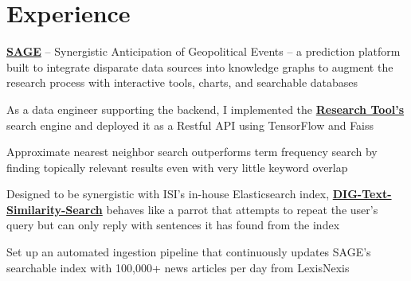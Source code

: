 \documentclass[letterpaper]{deedy-resume} %
\begin{document}
\begin{minipage}[t]{0.33\textwidth}
\sectionspace %


\end{minipage} %
\hfill
%
%
\begin{minipage}[t]{0.66\textwidth} %


\section{Experience}

\vspace{\topsep} %
\begin{tightitemize}
\item \href{https://sage-platform.isi.edu}{\bf SAGE} -- Synergistic Anticipation of Geopolitical Events -- a prediction platform built to integrate disparate data sources into knowledge graphs to augment the research process with interactive tools, charts, and searchable databases
\item As a data engineer supporting the backend, I implemented the \href{http://54.153.12.18/research-tool/?referrer=rct&id=UXVlc3Rpb25Ob2RlOjMxMA==&token=eyJ0eXAiOiJKV1QiLCJhbGciOiJIUzI1NiJ9.eyJ1c2VyX2lkIjoxODExLCJ1c2VybmFtZSI6ImFkbWluIiwiZXhwIjoxNTYxODE3NTMzLCJlbWFpbCI6InNhZ2VAaXNpLmVkdSJ9.bFMd1C0R938hAJic-gzNEXTfI1bpZZW_VusjpXAommg}{\bf Research Tool's} search engine and deployed it as a Restful API using TensorFlow and Faiss
\item Approximate nearest neighbor search outperforms term frequency search by finding topically relevant results even with very little keyword overlap
\item Designed to be synergistic with ISI's in-house Elasticsearch index, \href{https://github.com/usc-isi-i2/dig-text-similarity-search}{\bf DIG-Text-Similarity-Search} behaves like a parrot that attempts to repeat the user's query but can only reply with sentences it has found from the index 
\item Set up an automated ingestion pipeline that continuously updates SAGE's searchable index with 100,000+ news articles per day from LexisNexis 
\end{tightitemize}



\end{minipage}
\end{document}

